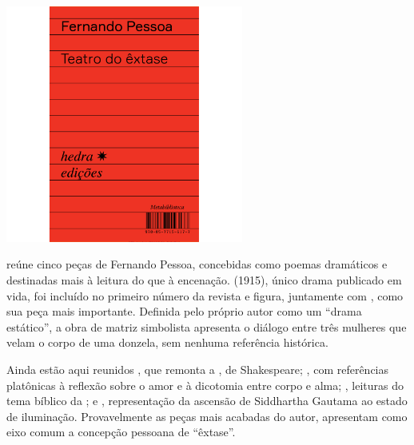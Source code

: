 \begin{center}
\hspace*{-3.5cm}
\hspace*{3cm}\includegraphics[width=78mm]{./grid/pessoa.jpg}
\end{center}

\hspace*{-7cm}\hrulefill\hspace*{-7cm}

\medskip

 reúne cinco peças de Fernando Pessoa, concebidas 
como poemas dramáticos e destinadas mais à leitura do que à encenação. 
{} (1915), único drama publicado em vida, foi incluído no
primeiro número da revista {} e figura, juntamente com
{}, como sua peça mais importante.  Definida pelo próprio autor
como um ``drama estático'', a obra de matriz simbolista apresenta o diálogo
entre três mulheres que velam o corpo de uma donzela, sem nenhuma referência
histórica.

Ainda estão aqui reunidos {}, que remonta a {}, de Shakespeare; {}, com referências platônicas à reflexão sobre o amor e à dicotomia entre corpo e alma; {}, leituras do
tema bíblico da {}; e {}, representação da ascensão de Siddhartha Gautama ao estado de iluminação. Provavelmente as peças mais acabadas do autor, apresentam como eixo comum a concepção pessoana de ``êxtase''. 
%

\vfill

\hspace*{-.4cm}\begin{minipage}[c]{.5\linewidth}
\small{
{}}
\end{minipage}

